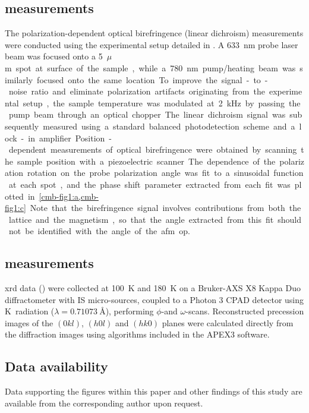 \subsection{ measurements}

The polarization-dependent optical birefringence (linear dichroism) measurements were conducted using the experimental setup detailed in \citet{little_three-state_2020}.
A \qty{633}{nm} probe laser beam was focused onto a \qty{5}{$\mu$ m} spot at surface of the sample, while a \qty{780}{nm} pump/heating beam was similarly focused onto the same location.
To improve the signal-to-noise ratio and eliminate polarization artifacts originating from the experimental setup, the sample temperature was modulated at \qty{2}{kHz} by passing the pump beam through an optical chopper.
The linear dichroism signal was subsequently measured using a standard balanced photodetection scheme and a lock-in amplifier.
Position-dependent measurements of optical birefringence were obtained by scanning the sample position with a piezoelectric scanner.
The dependence of the polarization rotation on the probe polarization angle was fit to a sinusoidal function at each spot, and the phase shift parameter extracted from each fit was plotted in \cref{cmb-fig1:a,cmb-fig1:c}.
Note that the birefringence signal involves contributions from both the lattice and the magnetism, so that the angle extracted from this fit should not be identified with the angle of the \gls{afm} \gls{op}.

\subsection{ measurements}

\Gls{xrd} data () were collected at \qty{100}{K} and \qty{180}{K} on a Bruker-AXS X8 Kappa Duo diffractometer with I\textmu S micro-sources, coupled to a Photon 3 CPAD detector using  K\textalpha~radiation ($\lambda = \qty{0.71073}{\angstrom}$), performing $\phi$-and $\omega$-scans. 
Reconstructed precession images of the $(0kl)$, $(h0l)$ and $(hk0)$ planes were calculated directly from the diffraction images using algorithms included in the APEX3\citep{apex} software.  

\subsection{Data availability}

Data supporting the figures within this paper and other findings of this study are available from the corresponding author upon request.

